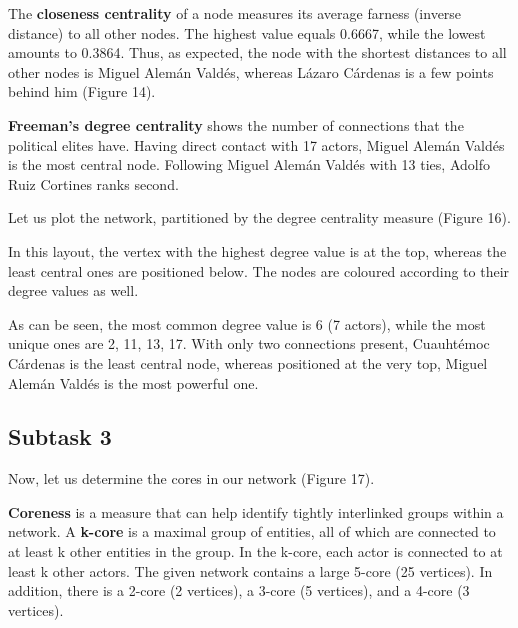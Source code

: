 
The \textbf{closeness centrality} of a node measures its average farness (inverse distance) to all other nodes. The highest value equals 0.6667, while the lowest amounts to 0.3864. Thus, as expected, the node with the shortest distances to all other nodes is Miguel Alemán Valdés, whereas Lázaro Cárdenas is a few points behind him  (Figure 14).


\textbf{Freeman’s degree centrality} shows the number of connections that the political elites have. Having direct contact with 17 actors, Miguel Alemán Valdés is the most central node. Following Miguel Alemán Valdés with 13 ties, Adolfo Ruiz Cortines ranks second.

\FloatBarrier


Let us plot the network, partitioned by the degree centrality measure (Figure 16).


In this layout, the vertex with the highest degree value is at the top, whereas the least central ones are positioned below. The nodes are coloured according to their degree values as well.

As can be seen, the most common degree value is 6 (7 actors), while the most unique ones are 2, 11, 13, 17. With only two connections present, Cuauhtémoc Cárdenas is the least central node, whereas positioned at the very top, Miguel Alemán Valdés is the most powerful one.


\FloatBarrier
\clearpage


\subsection{Subtask 3}
Now, let us determine the cores in our network (Figure 17).


\textbf{Coreness} is a measure that can help identify tightly interlinked groups within a network. A \textbf{k-core} is a maximal group of entities, all of which are connected to at least k other entities in the group.  In the k-core, each actor is connected to at least k other actors. The given network contains a large 5-core (25 vertices). In addition, there is a 2-core (2 vertices), a 3-core (5 vertices), and a 4-core (3 vertices).

